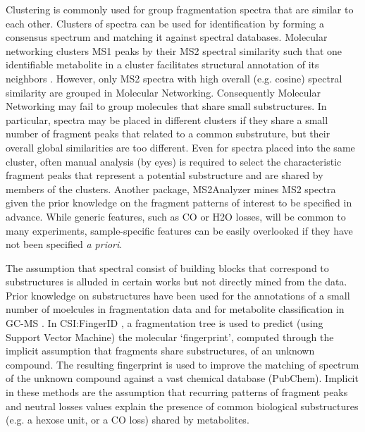Clustering is commonly used for group fragmentation spectra that are similar to each other. Clusters of spectra can be used for identification by forming a consensus spectrum and matching it against spectral databases. Molecular networking clusters MS1 peaks by their MS2 spectral similarity such that one identifiable metabolite in a cluster facilitates structural annotation of its neighbors \cite{yang2013molecular, nguyen2013ms, van2016urinary}.  However, only MS2 spectra with high overall (e.g. cosine) spectral similarity are grouped in Molecular Networking. Consequently Molecular Networking may fail to group molecules that share small substructures. In particular, spectra may be placed in different clusters if they share a small number of fragment peaks that related to a common substruture, but their overall global similarities are too different. Even for spectra placed into the same cluster, often manual analysis (by eyes) is required to select the characteristic fragment peaks that represent a potential substructure and are shared by members of the clusters. Another package, MS2Analyzer \cite{ma2014ms2analyzer} mines MS2 spectra given the prior knowledge on the fragment patterns of interest to be specified in advance. While generic features, such as CO or H2O losses, will be common to many experiments, sample-specific features can be easily overlooked if they have not been specified \textit{a priori}.

The assumption that spectral consist of building blocks that correspond to substructures is alluded in certain works but not directly mined from the data. Prior knowledge on substructures have been used for the annotations of a small number of moelcules in fragmentation data \cite{Sweeney2014} and for metabolite classification in GC-MS \cite{Scott1994, Hummel2010}. In CSI:FingerID \cite{Duhrkop2015}, a fragmentation tree is used to predict (using Support Vector Machine) the molecular `fingerprint', computed through the implicit assumption that fragments share substructures, of an unknown compound. The resulting fingerprint is used to improve the matching of spectrum of the unknown compound against a vast chemical database (PubChem). Implicit in these methods are the assumption that recurring patterns of fragment peaks and neutral losses values explain the presence of common biological substructures (e.g. a hexose unit, or a CO loss) shared by metabolites. 

